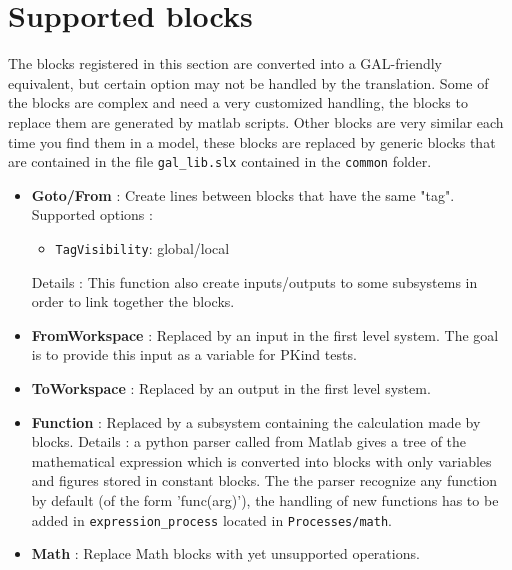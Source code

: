 \documentclass[a4paper,12pt]{article}
\begin{document}
\section{Supported blocks}

The blocks registered in this section are converted into a GAL-friendly equivalent, but certain option may not be handled by the translation.
Some of the blocks are complex and need a very customized handling, the blocks to replace them are generated by matlab scripts.
Other blocks are very similar each time you find them in a model, these blocks are replaced by generic blocks that are contained in the file \texttt{gal\_lib.slx} contained in the \texttt{common} folder.
~\\

\begin{itemize}
\item
\textbf{Goto/From} : Create lines between blocks that have the same "tag". \newline
	Supported options :
	\begin{itemize}
	\item
	\texttt{TagVisibility}: global/local
	\end{itemize}
Details : This function also create inputs/outputs to some subsystems in order to link together the blocks. 
~\\
\item
\textbf{FromWorkspace} : Replaced by an input in the first level system. \newline
The goal is to provide this input as a variable for PKind tests.
~\\
\item
\textbf{ToWorkspace} : Replaced by an output in the first level system.
~\\
\item
\textbf{Function} : Replaced by a subsystem containing the calculation made by blocks. \newline
Details : a python parser called from Matlab gives a tree of the mathematical expression which is converted into blocks with only variables and figures stored in constant blocks. \newline
The the parser recognize any function by default (of the form 'func(arg)'), the handling of new functions has to be added in \texttt{expression\_process} located in \texttt{Processes/math}. \newline
\item
\textbf{Math} : Replace Math blocks with yet unsupported operations. \newline

\end{itemize}
\end{document}
